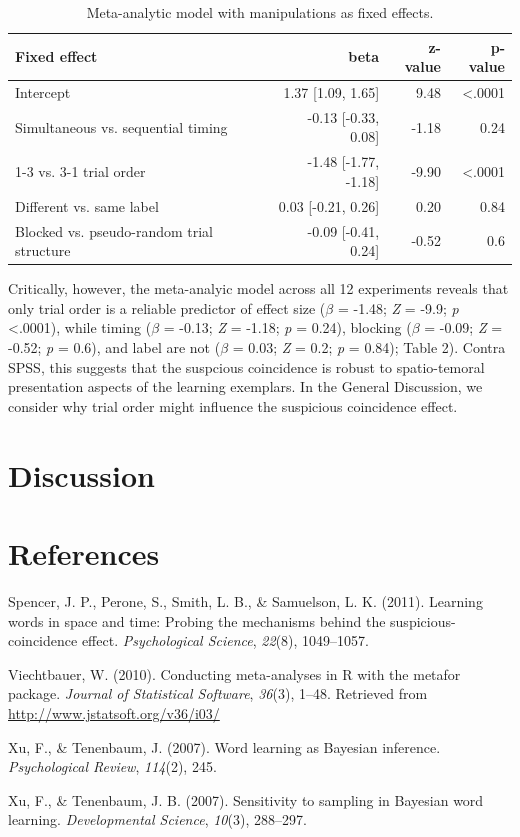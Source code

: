 \documentclass[english,floatsintext,man]{apa6}
\theoremstyle{definition}
\theoremstyle{definition}
\theoremstyle{remark}
\begin{document}
\begin{table}

\caption{\label{tab:unnamed-chunk-3}Meta-analytic model with manipulations as fixed effects.}
\centering
\fontsize{12}{14}\selectfont
\begin{tabular}[t]{lrrr}
\toprule
Fixed effect & beta & z-value & p-value\\
\midrule
Intercept & 1.37 [1.09, 1.65] & 9.48 & <.0001\\
Simultaneous vs. sequential timing & -0.13 [-0.33, 0.08] & -1.18 & 0.24\\
1-3 vs. 3-1 trial order & -1.48 [-1.77, -1.18] & -9.90 & <.0001\\
Different vs. same label & 0.03 [-0.21, 0.26] & 0.20 & 0.84\\
Blocked vs. pseudo-random trial structure & -0.09 [-0.41, 0.24] & -0.52 & 0.6\\
\bottomrule
\end{tabular}
\end{table}

Critically, however, the meta-analyic model across all 12 experiments
reveals that only trial order is a reliable predictor of effect size
(\(\beta\) = -1.48; \emph{Z} = -9.9; \emph{p} \textless{}.0001), while
timing (\(\beta\) = -0.13; \emph{Z} = -1.18; \emph{p} = 0.24), blocking
(\(\beta\) = -0.09; \emph{Z} = -0.52; \emph{p} = 0.6), and label are not
(\(\beta\) = 0.03; \emph{Z} = 0.2; \emph{p} = 0.84); Table 2). Contra
SPSS, this suggests that the suspcious coincidence is robust to
spatio-temoral presentation aspects of the learning exemplars. In the
General Discussion, we consider why trial order might influence the
suspicious coincidence effect.

\section{Discussion}\label{discussion}

\newpage

\section{References}\label{references}

\setlength{\parindent}{-0.5in} \setlength{\leftskip}{0.5in}

\hypertarget{refs}{}
\hypertarget{ref-spencer2011learning}{}
Spencer, J. P., Perone, S., Smith, L. B., \& Samuelson, L. K. (2011).
Learning words in space and time: Probing the mechanisms behind the
suspicious-coincidence effect. \emph{Psychological Science},
\emph{22}(8), 1049--1057.

\hypertarget{ref-R-metafor}{}
Viechtbauer, W. (2010). Conducting meta-analyses in R with the metafor
package. \emph{Journal of Statistical Software}, \emph{36}(3), 1--48.
Retrieved from \url{http://www.jstatsoft.org/v36/i03/}

\hypertarget{ref-xu2007word}{}
Xu, F., \& Tenenbaum, J. (2007). Word learning as Bayesian inference.
\emph{Psychological Review}, \emph{114}(2), 245.

\hypertarget{ref-xu2007}{}
Xu, F., \& Tenenbaum, J. B. (2007). Sensitivity to sampling in Bayesian
word learning. \emph{Developmental Science}, \emph{10}(3), 288--297.
\end{document}
